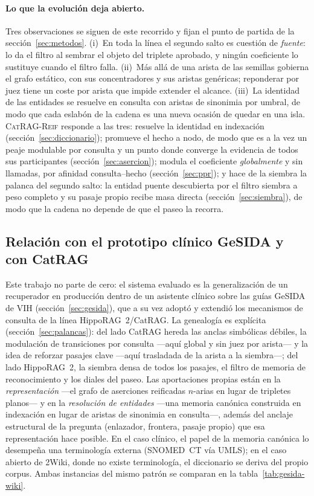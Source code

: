 \documentclass[11pt,a4paper]{article}
\newcommand{\sys}{\textsc{CatRAG-Reif}}          %
\begin{document}
\paragraph{Lo que la evolución deja abierto.}
Tres observaciones se siguen de este recorrido y fijan el punto de partida
de la sección~\ref{sec:metodos}. (i)~En toda la línea el segundo salto es
cuestión de \emph{fuente}: lo da el filtro al sembrar el objeto del
triplete aprobado, y ningún coeficiente lo sustituye cuando el filtro
falla. (ii)~Más allá de una arista de las semillas gobierna el grafo
estático, con sus concentradores y sus aristas genéricas; reponderar por
juez tiene un coste por arista que impide extender el alcance. (iii)~La
identidad de las entidades se resuelve en consulta con aristas de
sinonimia por umbral, de modo que cada eslabón de la cadena es una nueva
ocasión de quedar en una \guillemotleft{}isla\guillemotright{}. \sys{} responde a las tres:
resuelve la identidad en indexación (sección~\ref{sec:diccionario});
promueve el hecho a nodo, de modo que es a la vez un peaje modulable por
consulta y un punto donde converge la evidencia de todos sus
participantes (sección~\ref{sec:asercion}); modula el coeficiente
\emph{globalmente} y sin llamadas, por afinidad consulta--hecho
(sección~\ref{sec:ppr}); y hace de la siembra la palanca del segundo
salto: la entidad puente descubierta por el filtro siembra a peso
completo y su pasaje propio recibe masa directa
(sección~\ref{sec:siembra}), de modo que la cadena no depende de que el
paseo la recorra.

\subsection{Relación con el prototipo clínico GeSIDA y con CatRAG}
\label{sec:relacion}

Este trabajo no parte de cero: el sistema evaluado es la generalización de
un recuperador en producción dentro de un asistente clínico sobre las guías
GeSIDA de VIH (sección~\ref{sec:gesida}), que a su vez adoptó y extendió los
mecanismos de consulta de la línea HippoRAG~2/CatRAG. La genealogía es
explícita (sección~\ref{sec:palancas}): del lado CatRAG hereda las
anclas simbólicas débiles, la modulación de transiciones por consulta
---aquí global y sin juez por arista--- y la idea de reforzar pasajes
clave ---aquí trasladada de la arista a la siembra---; del lado
HippoRAG~2, la siembra densa de todos los pasajes, el filtro de memoria
de reconocimiento y los diales del paseo. Las aportaciones propias
están en la \emph{representación} ---el grafo de aserciones reificadas
$n$-arias en lugar de tripletes planos--- y en la \emph{resolución de
entidades} ---una memoria canónica construida en indexación en lugar de
aristas de sinonimia en consulta---, además del anclaje estructural de la
pregunta (enlazador, frontera, pasaje propio) que esa representación hace
posible. En el caso clínico, el papel de la memoria canónica lo desempeña
una terminología externa (SNOMED~CT vía UMLS); en el caso abierto de
2Wiki, donde no existe terminología, el diccionario se deriva del propio
corpus. Ambas instancias del mismo patrón se comparan en la
tabla~\ref{tab:gesida-wiki}.
\end{document}
